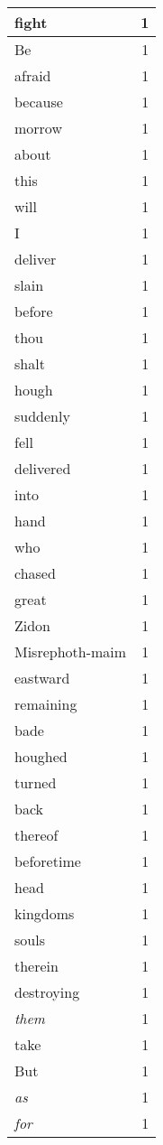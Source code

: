 \begin{center}
\begin{longtable}{l|r}
fight & 1 \\ \hline
Be & 1 \\ \hline
afraid & 1 \\ \hline
because & 1 \\ \hline
morrow & 1 \\ \hline
about & 1 \\ \hline
this & 1 \\ \hline
will & 1 \\ \hline
I & 1 \\ \hline
deliver & 1 \\ \hline
slain & 1 \\ \hline
before & 1 \\ \hline
thou & 1 \\ \hline
shalt & 1 \\ \hline
hough & 1 \\ \hline
suddenly & 1 \\ \hline
fell & 1 \\ \hline
delivered & 1 \\ \hline
into & 1 \\ \hline
hand & 1 \\ \hline
who & 1 \\ \hline
chased & 1 \\ \hline
great & 1 \\ \hline
Zidon & 1 \\ \hline
Misrephoth-maim & 1 \\ \hline
eastward & 1 \\ \hline
remaining & 1 \\ \hline
bade & 1 \\ \hline
houghed & 1 \\ \hline
turned & 1 \\ \hline
back & 1 \\ \hline
thereof & 1 \\ \hline
beforetime & 1 \\ \hline
head & 1 \\ \hline
kingdoms & 1 \\ \hline
souls & 1 \\ \hline
therein & 1 \\ \hline
destroying & 1 \\ \hline
\emph{them} & 1 \\ \hline
take & 1 \\ \hline
But & 1 \\ \hline
\emph{as} & 1 \\ \hline
\emph{for} & 1 \\ \hline

\end{longtable}
\end{center}
